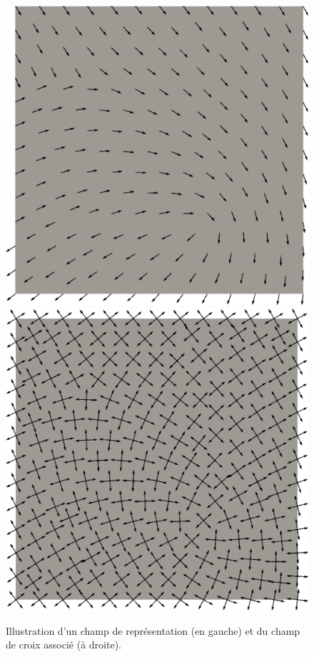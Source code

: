 \begin{figure}[h!]
  \centering
  \includegraphics[scale=0.27]{images/repre_field.pdf}
  \hfill
  \includegraphics[scale=0.27]{images/cross_from_repre_field.pdf}
  \caption{Illustration d'un champ de représentation (en gauche) et du champ de croix associé (à droite).}
  \label{fig:repr_to_cross}
\end{figure}

